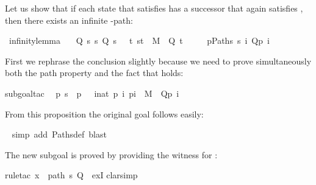 \begin{isabellebody}
\begin{isamarkuptext}
Let us show that if each state  that satisfies 
has a successor that again satisfies , then there exists an infinite -path:%
\end{isamarkuptext}%
\isamarkuptrue%
\ infinity{\isacharunderscore}lemma{\isacharcolon}\isanewline
\ \ {\isachardoublequote}{\isasymlbrakk}\ Q\ s{\isacharsemicolon}\ {\isasymforall}s{\isachardot}\ Q\ s\ {\isasymlongrightarrow}\ {\isacharparenleft}{\isasymexists}\ t{\isachardot}\ {\isacharparenleft}s{\isacharcomma}t{\isacharparenright}\ {\isasymin}\ M\ {\isasymand}\ Q\ t{\isacharparenright}\ {\isasymrbrakk}\ {\isasymLongrightarrow}\isanewline
\ \ \ {\isasymexists}p{\isasymin}Paths\ s{\isachardot}\ {\isasymforall}i{\isachardot}\ Q{\isacharparenleft}p\ i{\isacharparenright}{\isachardoublequote}\isamarkupfalse%
%
\begin{isamarkuptxt}%
\noindent
First we rephrase the conclusion slightly because we need to prove simultaneously
both the path property and the fact that  holds:%
\end{isamarkuptxt}%
\isamarkuptrue%
subgoal{\isacharunderscore}tac\isanewline
\ \ {\isachardoublequote}{\isasymexists}p{\isachardot}\ s\ {\isacharequal}\ p\ {}\ {\isasymand}\ {\isacharparenleft}{\isasymforall}i{\isacharcolon}{\isacharcolon}nat{\isachardot}\ {\isacharparenleft}p\ i{\isacharcomma}\ p{\isacharparenleft}i{\isacharplus}{}{\isacharparenright}{\isacharparenright}\ {\isasymin}\ M\ {\isasymand}\ Q{\isacharparenleft}p\ i{\isacharparenright}{\isacharparenright}{\isachardoublequote}{\isacharparenright}\isamarkupfalse%
%
\begin{isamarkuptxt}%
\noindent
From this proposition the original goal follows easily:%
\end{isamarkuptxt}%
\ \isamarkuptrue%
simp\ add{\isacharcolon}\ Paths{\isacharunderscore}def{\isacharcomma}\ blast{\isacharparenright}\isamarkupfalse%
%
\begin{isamarkuptxt}%
\noindent
The new subgoal is proved by providing the witness  for :%
\end{isamarkuptxt}%
\isamarkuptrue%
rule{\isacharunderscore}tac\ x\ {\isacharequal}\ {\isachardoublequote}path\ s\ Q{\isachardoublequote}\ \ exI{\isacharparenright}\isanewline
\isamarkupfalse%
clarsimp{\isacharparenright}\isamarkupfalse%
%
\begin{isamarkuptxt}%

\end{isamarkuptxt}
\end{isabellebody}
